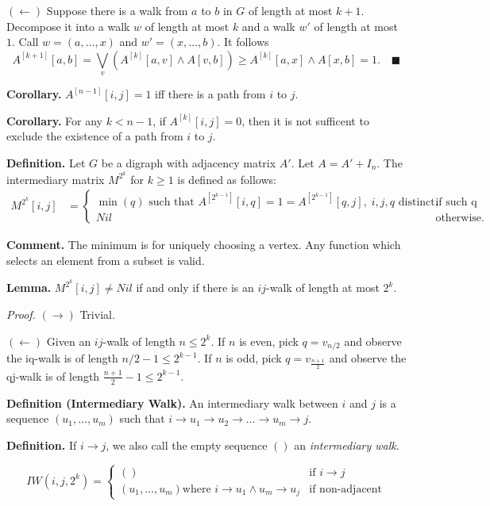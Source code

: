 $(\leftarrow)$ Suppose there is a walk from $a$ to $b$ in $G$ of length at most $k+1$. Decompose it into a walk $w$ of length at most $k$ and a walk $w'$ of length at most $1$. Call $w = (a, \dots, x)$ and $w' = (x, \dots, b)$. It follows
$$
A^{[k+1]}[a,b] = \bigvee_{v}(A^{[k]}[a,v] \land A[v,b]) \ge A^{[k]}[a,x] \land A[x,b] = 1. \quad \blacksquare
$$

\textbf{Corollary.} $A^{[n-1]}[i,j] = 1$ iff there is a path from $i$ to $j$.

\textbf{Corollary.} For any $k < n-1$, if $A^{[k]}[i,j] = 0$, then it is not sufficent to exclude the existence of a path from $i$ to $j$.

\textbf{Definition.} Let $G$ be a digraph with adjacency matrix $A'$. Let $A = A' + I_n$. The intermediary matrix $M^{2^k}$ for $k \geq 1$ is defined as follows:
\begin{align*}
  M^{2^k}[i,j] &= \begin{cases} 
    \min(q) \text{ such that } A^{[2^{k-1}]}[i,q] = 1 = A^{[2^{k-1}]}[q,j], \; i,j,q \text{ distinct,} & \text{if such q exists} \\
    Nil & \text{otherwise.}
  \end{cases}
\end{align*}

\textbf{Comment.} The minimum is for uniquely choosing a vertex. Any function which selects an element from a subset is valid.

\textbf{Lemma.} $M^{2^k}[i,j] \neq Nil$ if and only if there is an $ij$-walk of length at most $2^k$.

\textit{Proof.} $(\rightarrow)$ Trivial.

$(\leftarrow)$ Given an $ij$-walk of length $n \leq 2^k$. If $n$ is even, pick $q = v_{n/2}$ and observe the iq-walk is of length $n/2 - 1 \leq 2^{k-1}$. If $n$ is odd, pick $q = v_{\frac{n+1}{2}}$ and observe the qj-walk is of length $\frac{n+1}{2} - 1 \leq 2^{k-1}$.

\textbf{Definition (Intermediary Walk).} An intermediary walk between $i$ and $j$ is a sequence $(u_1, \dots, u_m)$ such that $i \rightarrow u_1 \rightarrow u_2 \rightarrow \dots \rightarrow u_m \rightarrow j$.

\textbf{Definition.} If $i \rightarrow j$, we also call the empty sequence $()$ an \textit{intermediary walk}.

$$
  IW(i,j,2^k) = \begin{cases} 
    () & \text{if } i \rightarrow j \\
    (u_1, \dots, u_m) \text{where } i \rightarrow u_1 \wedge u_m \rightarrow u_j & \text{if non-adjacent}
       \end{cases}
$$

